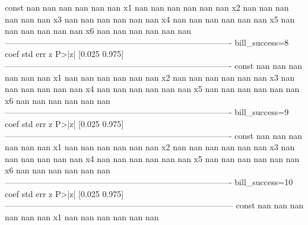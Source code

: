 \begin{pyprint}
const                 nan        nan        nan        nan         nan         nan
x1                    nan        nan        nan        nan         nan         nan
x2                    nan        nan        nan        nan         nan         nan
x3                    nan        nan        nan        nan         nan         nan
x4                    nan        nan        nan        nan         nan         nan
x5                    nan        nan        nan        nan         nan         nan
x6                    nan        nan        nan        nan         nan         nan
----------------------------------------------------------------------------------
bill_success=8       coef    std err          z      P>|z|      [0.025      0.975]
----------------------------------------------------------------------------------
const                 nan        nan        nan        nan         nan         nan
x1                    nan        nan        nan        nan         nan         nan
x2                    nan        nan        nan        nan         nan         nan
x3                    nan        nan        nan        nan         nan         nan
x4                    nan        nan        nan        nan         nan         nan
x5                    nan        nan        nan        nan         nan         nan
x6                    nan        nan        nan        nan         nan         nan
----------------------------------------------------------------------------------
bill_success=9       coef    std err          z      P>|z|      [0.025      0.975]
----------------------------------------------------------------------------------
const                 nan        nan        nan        nan         nan         nan
x1                    nan        nan        nan        nan         nan         nan
x2                    nan        nan        nan        nan         nan         nan
x3                    nan        nan        nan        nan         nan         nan
x4                    nan        nan        nan        nan         nan         nan
x5                    nan        nan        nan        nan         nan         nan
x6                    nan        nan        nan        nan         nan         nan
----------------------------------------------------------------------------------
bill_success=10       coef    std err          z      P>|z|      [0.025      0.975]
-----------------------------------------------------------------------------------
const                  nan        nan        nan        nan         nan         nan
x1                     nan        nan        nan        nan         nan         nan

\end{pyprint}
